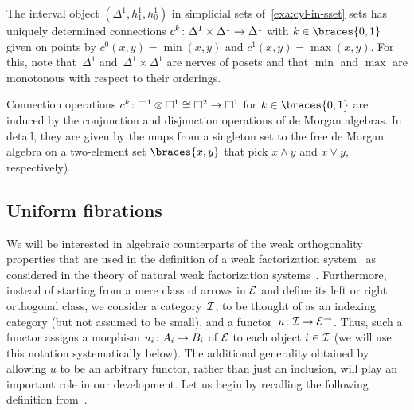 \documentclass[reqno,10pt,a4paper,oneside,draft]{amsart}
\begin{document}
\begin{example}
The interval object $(\Delta^1, h_1^1, h_0^1)$ in simplicial sets of~\cref{exa:cyl-in-sset} sets has uniquely determined connections $c^k \co \Delta^1 \times \Delta^1 \to \Delta^1$ with $k \in \braces{0, 1}$ given on points by $c^0(x, y) = \min(x, y)$ and $c^1(x, y) = \max(x, y)$.
For this, note that~$\Delta^1$ and~$\Delta^1 \times \Delta^1$ are nerves of posets and that $\min$ and $\max$ are monotonous with respect to their orderings.
\end{example}

\begin{example}
Connection operations $c^k \co \Box^1 \otimes \Box^1 \iso \Box^2 \to \Box^1$ for $k \in \braces{0, 1}$ are induced by the conjunction and disjunction operations of de Morgan algebras.
In detail, they are given by the maps from a singleton set to the free de Morgan algebra on a two-element set $\braces{x, y}$ that pick $x \wedge y$ and $x \vee y$, respectively).
\end{example}

\subsection*{Uniform fibrations}

We will be interested in algebraic counterparts of the weak orthogonality properties that are used in the definition of a weak factorization system~\cite{bousfield-wfs} as considered in the theory of natural weak factorization systems~\cite{grandis-tholen-nwfs}.
Furthermore, instead of starting from a mere class of arrows in $\catE$ and define its left or right orthogonal class, we consider a category~$\cal{I}$, to be thought of as an indexing category (but not assumed to be small), and a functor~$u \co \cal{I} \to \catE^\to$.
Thus, such a functor assigns a morphism $u_i \co A_i \to B_i$ of $\catE$ to each object $i \in \cal{I}$ (we will use this notation systematically below).
The additional generality obtained by allowing $u$ to be an arbitrary functor, rather than just an inclusion, will play an important role in our development.
Let us begin by recalling the following definition from~\cite{garner:small-object-argument}.
\end{document}
